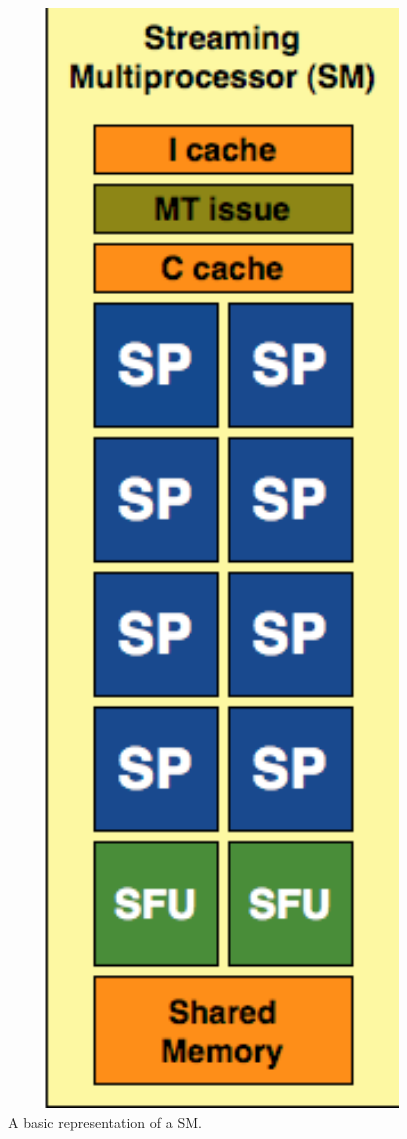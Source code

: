\begin{figure}[h!]
\centering
 \includegraphics[trim=1.4cm 6.1cm 6.5cm 1.8cm, clip, width=1\textwidth]{figures/SM.PNG} %
\caption{A basic representation of a SM.}\label{image:SM} 
\end{figure}
